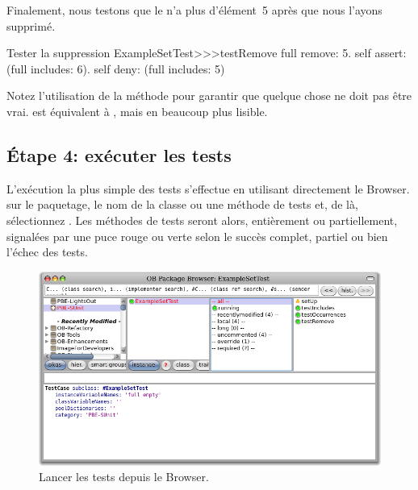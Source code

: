 \documentclass[a4paper,10pt,twoside]{book}
\begin{document}
Finalement, nous testons que le  n'a plus d'élément~5 après que nous l'ayons supprimé.

\begin{method}[testRemove]{Tester la suppression}
ExampleSetTest>>>testRemove
	full remove: 5.
	self assert: (full includes: 6).
	self deny: (full includes: 5)
\end{method}

\noindent
Notez l'utilisation de la méthode  pour garantir que quelque chose ne doit pas être vrai.
 est équivalent à , mais en beaucoup plus lisible.
\subsection{Étape 4: exécuter les tests}
L'exécution la plus simple des tests s'effectue en utilisant
directement le Browser. \Actclickz{} sur le paquetage, le nom de la
classe ou une méthode de tests et, de là, sélectionnez
.
Les méthodes de tests seront alors, entièrement ou partiellement,
signalées par une puce rouge ou verte selon le succès complet, partiel
ou bien l'échec des tests. %

\begin{figure}[tbh]
  \begin{center}
	\includegraphics[width=\linewidth]{browser-tests}
	\caption{Lancer les tests \sunit depuis le Browser.}
  \end{center}
\end{figure}
\end{document}

